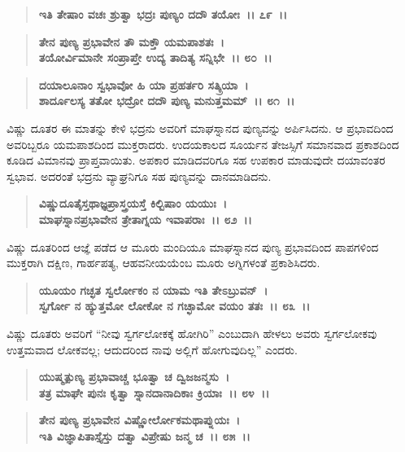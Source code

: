 \begin{verse}
\textbf{ಇತಿ ತೇಷಾಂ ವಚಃ ಶ್ರುತ್ವಾ ಭದ್ರಃ ಪುಣ್ಯಂ ದದೌ ತಯೋಃ~।। ೭೯~।।} 
\end{verse}

\begin{verse}
\textbf{ತೇನ ಪುಣ್ಯ ಪ್ರಭಾವೇನ ತೌ ಮಕ್ತೌ ಯಮಪಾಶತಃ~।}\\\textbf{ತಯೋರ್ವಿಮಾನೇ ಸಂಪ್ರಾಪ್ತೇ ಉದ್ಯ ತಾದಿತ್ಯ ಸನ್ನಿಭೇ~।। ೮೦~।। }
\end{verse}

\begin{verse}
\textbf{ದಯಾಲೂನಾಂ ಸ್ವಭಾವೋ ಹಿ ಯಾ ಪ್ರಹರ್ತರಿ ಸತ್ಕ್ರಿಯಾ~।}\\\textbf{ಶಾರ್ದೂಲಸ್ಯ ತತೋ ಭದ್ರೋ ದದೌ ಪುಣ್ಯ ಮನುತ್ತಮಮ್~।। ೮೧~।।}
\end{verse}

ವಿಷ್ಣು ದೂತರ ಈ ಮಾತನ್ನು ಕೇಳಿ ಭದ್ರನು ಅವರಿಗೆ ಮಾಘಸ್ನಾನದ ಪುಣ್ಯವನ್ನು ಅರ್ಪಿಸಿದನು. ಆ ಪ್ರಭಾವದಿಂದ ಅವರಿಬ್ಬರೂ ಯಮಪಾಶದಿಂದ ಮುಕ್ತರಾದರು. ಉದಯಕಾಲದ ಸೂರ್ಯನ ತೇಜಸ್ಸಿಗೆ ಸಮಾನವಾದ ಪ್ರಕಾಶದಿಂದ ಕೂಡಿದ ವಿಮಾನವು ಪ್ರಾಪ್ತವಾಯಿತು. ಅಪಕಾರ ಮಾಡಿದವರಿಗೂ ಸಹ ಉಪಕಾರ ಮಾಡುವುದೇ ದಯಾವಂತರ ಸ್ವಭಾವ. ಅದರಂತೆ ಭದ್ರನು ವ್ಯಾಘ್ರನಿಗೂ ಸಹ ಪುಣ್ಯವನ್ನು ದಾನಮಾಡಿದನು.

\begin{verse}
\textbf{ವಿಷ್ಣುದೂತೈಸ್ತಥಾಜ್ಞಪ್ರಾಸ್ತ್ರಯಸ್ತೆ ಕಿಲ್ಬಿಷಾಂ ಯಯುಃ~।}\\\textbf{ಮಾಘಸ್ನಾನಪ್ರಭಾವೇನ ತ್ರೇತಾಗ್ನಯ ಇವಾಪರಾಃ~।। ೮೨~।।}
\end{verse}

ವಿಷ್ಣು ದೂತರಿಂದ ಆಜ್ಞೆ ಪಡೆದ ಆ ಮೂರು ಮಂದಿಯೂ ಮಾಘಸ್ನಾನದ ಪುಣ್ಯ ಪ್ರಭಾವದಿಂದ ಪಾಪಗಳಿಂದ ಮುಕ್ತರಾಗಿ ದಕ್ಷಿಣ, ಗಾರ್ಹಪತ್ಯ, ಆಹವನೀಯಯೆಂಬ ಮೂರು ಅಗ್ನಿಗಳಂತೆ ಪ್ರಕಾಶಿಸಿದರು.

\begin{verse}
\textbf{ಯೂಯಂ ಗಚ್ಛತ ಸ್ವರ್ಲೋಕಂ ನ ಯಾಮ ಇತಿ ತೇಽಬ್ರುವನ್~।}\\\textbf{ಸ್ವರ್ಗೋ ನ ಹ್ಯುತ್ತಮೋ ಲೋಕೋ ನ ಗಚ್ಛಾಮೋ ವಯಂ ತತಃ~।। ೮೩~।।}
\end{verse}

ವಿಷ್ಣು ದೂತರು ಅವರಿಗೆ “ನೀವು ಸ್ವರ್ಗಲೋಕಕ್ಕೆ ಹೋಗಿರಿ” ಎಂಬುದಾಗಿ ಹೇಳಲು ಅವರು ಸ್ವರ್ಗಲೋಕವು ಉತ್ತಮವಾದ ಲೋಕವಲ್ಲ; ಆದುದರಿಂದ ನಾವು ಅಲ್ಲಿಗೆ ಹೋಗುವುದಿಲ್ಲ” ಎಂದರು.

\begin{verse}
\textbf{ಯುಷ್ಮತ್ಪುಣ್ಯ ಪ್ರಭಾವಾಚ್ಚ ಭೂತ್ವಾ ಚ ದ್ವಿಜಜನ್ಮಸು~।}\\\textbf{ತತ್ರ ಮಾಘೇ ಪುನಃ ಕೃತ್ವಾ ಸ್ನಾನದಾನಾದಿಕಾಃ ಕ್ರಿಯಾಃ~।। ೮೪~।।} 
\end{verse}

\begin{verse}
\textbf{ತೇನ ಪುಣ್ಯ ಪ್ರಭಾವೇನ ವಿಷ್ಣೋರ್ಲೋಕಮಥಾಪ್ನುಯಃ~।}\\\textbf{ಇತಿ ವಿಜ್ಞಾಪಿತಾಸ್ತೈಸ್ತು ದತ್ವಾ ವಿಪ್ರೇಷು ಜನ್ಮ ಚ~।। ೮೫~।। }
\end{verse}

